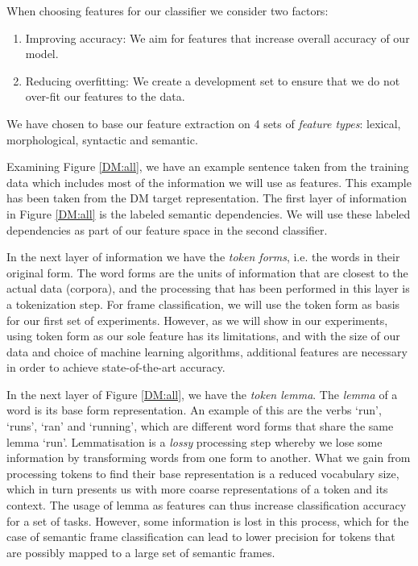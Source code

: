 When choosing features for our classifier we consider two factors:

\begin{enumerate}
    \item Improving accuracy: We aim for features that increase overall accuracy of our model.
    \item Reducing overfitting: We create a development set to ensure that we do not over-fit our features to the data.
\end{enumerate}

We have chosen to base our feature extraction on 4 sets of \textit{feature types}: lexical, morphological, syntactic and semantic.

Examining Figure \ref{DM:all}, we have an example sentence taken from the training data which includes most of the information we will use as features. This example has been taken from the DM target representation. The first layer of information in Figure \ref{DM:all} is the labeled semantic dependencies. We will use these labeled dependencies as part of our feature space in the second classifier. 

In the next layer of information we have the \textit{token forms}, i.e. the words in their original form. The word forms are the units of information that are closest to the actual data (corpora), and the processing that has been performed in this layer is a tokenization step. For frame classification, we will use the token form as basis for our first set of experiments. However, as we will show in our experiments, using token form as our sole feature has its limitations, and with the size of our data and choice of machine learning algorithms, additional features are necessary in order to achieve state-of-the-art accuracy.

In the next layer of Figure \ref{DM:all}, we have the \textit{token lemma}. The \textit{lemma} of a word is its base form representation. An example of this are the verbs `run', `runs', `ran' and `running', which are different word forms that share the same lemma `run'. Lemmatisation is a \textit{lossy} processing step whereby we lose some information by transforming words from one form to another. What we gain from processing tokens to find their base representation is a reduced vocabulary size, which in turn presents us with more coarse representations of a token and its context. The usage of lemma as features can thus increase classification accuracy for a set of tasks. However, some information is lost in this process, which for the case of semantic frame classification can lead to lower precision for tokens that are possibly mapped to a large set of semantic frames.


